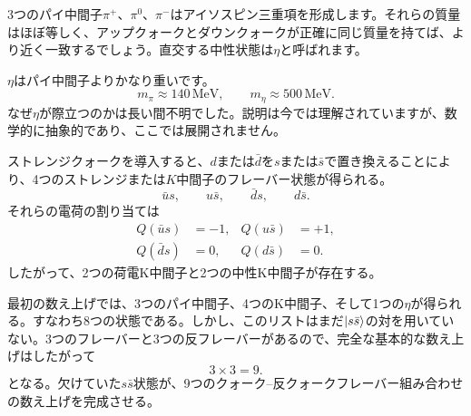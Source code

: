 3つのパイ中間子\(\pi^+\)、\(\pi^0\)、\(\pi^-\)はアイソスピン三重項を形成します。それらの質量はほぼ等しく、アップクォークとダウンクォークが正確に同じ質量を持てば、より近く一致するでしょう。直交する中性状態は\(\eta\)と呼ばれます。

\(\eta\)はパイ中間子よりかなり重いです。
\begin{equation}
m_\pi \approx 140\,\mathrm{MeV},
\qquad
m_\eta \approx 500\,\mathrm{MeV}.
\end{equation}
なぜ\(\eta\)が際立つのかは長い間不明でした。説明は今では理解されていますが、数学的に抽象的であり、ここでは展開されません。

\begin{classroomqa}
\end{classroomqa}

\begin{classroomqa}
\end{classroomqa}

\begin{classroomqa}
\end{classroomqa}

ストレンジクォークを導入すると、\(d\)または\(\bar d\)を\(s\)または\(\bar s\)で置き換えることにより、4つのストレンジまたは\(K\)中間子のフレーバー状態が得られる。
\begin{equation}
\bar u s,\qquad u\bar s,\qquad \bar d s,\qquad d\bar s.
\end{equation}
それらの電荷の割り当ては
\begin{align}
Q(\bar u s) &=-1,
&
Q(u\bar s) &=+1,
\\
Q(\bar d s) &=0,
&
Q(d\bar s) &=0.
\end{align}
したがって、2つの荷電K中間子と2つの中性K中間子が存在する。

最初の数え上げでは、3つのパイ中間子、4つのK中間子、そして1つの\(\eta\)が得られる。すなわち8つの状態である。しかし、このリストはまだ\(\left\lvert s\bar s\right\rangle\)の対を用いていない。3つのフレーバーと3つの反フレーバーがあるので、完全な基本的な数え上げはしたがって
\begin{equation}
3\times3=9.
\end{equation}
となる。欠けていた\(s\bar s\)状態が、9つのクォーク--反クォークフレーバー組み合わせの数え上げを完成させる。
